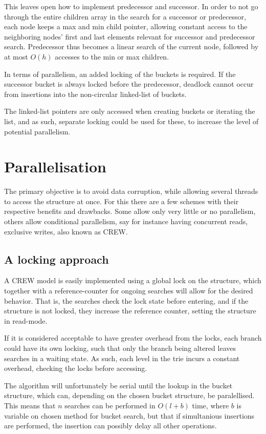 This leaves open how to implement {\keyword predecessor} and {\keyword successor}.
In order to not go through the entire children array in the search for a
{\keyword successor} or {\keyword predecessor}, each node keeps a max and min child pointer,
allowing constant access to the neighboring nodes' first and last elements
relevant for successor and predecessor search. Predecessor thus becomes a
linear search of the current node, followed by at most $O(h)$ accesses to
the {\keyword min} or {\keyword max} children.

In terms of parallelism, an added locking of the buckets is required.
If the successor bucket is always locked before the predecessor, deadlock cannot occur
from insertions into the non-circular linked-list of buckets.

The linked-list pointers are only accessed when creating buckets or iterating
the list, and as such, separate locking could be used for these, to increase
the level of potential parallelism.

\section{Parallelisation}
The primary objective is to avoid data corruption, while allowing several
threads to access the structure at once. For this there are a few schemes with
their respective benefits and drawbacks. Some allow only very little or no
parallelism, others allow conditional parallelism, say for instance having
concurrent reads, exclusive writes, also known as CREW.

\subsection{A locking approach}
A CREW model is easily implemented using a global lock on the structure, which
together with a reference-counter for ongoing searches will allow for the
desired behavior. That is, the searches check the lock state before entering,
and if the structure is not locked, they increase the reference counter,
setting the structure in read-mode.


If it is considered acceptable to have greater overhead from the locks, each
branch could have its own locking, such that only the branch being altered
leaves searches in a waiting state. As such, each level in the trie incurs a
constant overhead, checking the locks before accessing.

The algorithm will unfortunately be serial until the lookup in the bucket
structure, which can, depending on the chosen bucket structure, be
paralellised. This means that $n$ searches can be performed in $O(l+b)$ time,
where $b$ is variable on chosen method for bucket search, but that if
simultanious insertions are performed, the insertion can possibly delay all
other operations.



